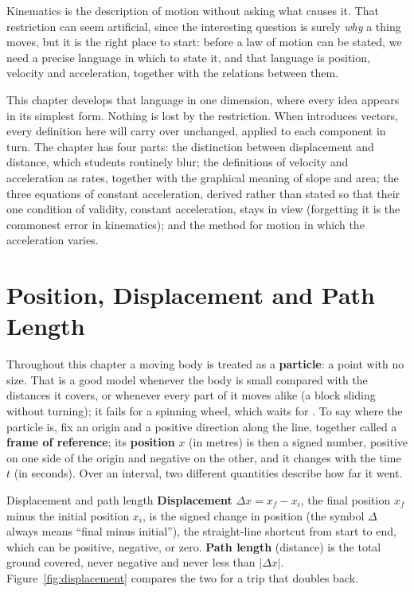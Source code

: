 
Kinematics is the description of motion without asking what causes it. That restriction can seem
artificial, since the interesting question is surely \emph{why} a thing moves, but it is the right
place to start: before a law of motion can be stated, we need a precise language in which to state it,
and that language is position, velocity and acceleration, together with the relations between them.

This chapter develops that language in one dimension, where every idea appears in its simplest form.
Nothing is lost by the restriction. When  introduces vectors, every definition here will carry
over unchanged, applied to each component in turn. The chapter has four parts: the distinction
between displacement and distance, which students routinely blur; the definitions of velocity and
acceleration as rates, together with the graphical meaning of slope and area; the three equations
of constant acceleration, derived rather than stated so that their one condition of validity,
constant acceleration, stays in view (forgetting it is the commonest error in kinematics); and the method for motion in which the acceleration varies.

\section{Position, Displacement and Path Length}

Throughout this chapter a moving body is treated as a \textbf{particle}: a point with no size. That is
a good model whenever the body is small compared with the distances it covers, or whenever every part of
it moves alike (a block sliding without turning); it fails for a spinning wheel, which waits for
. To say where the particle is, fix an origin and a positive direction along the line,
together called a \textbf{frame of reference}; its \textbf{position} $x$ (in metres) is then a signed
number, positive on one side of the origin and negative on the other, and it changes with the time $t$
(in seconds). Over an interval, two different quantities describe how far it went.

\begin{defbox}{Displacement and path length}
\textbf{Displacement} $\Delta x=x_f-x_i$, the final position $x_f$ minus the initial position $x_i$, is
the signed change in position (the symbol $\Delta$ always means ``final minus initial''), the straight-line shortcut
from start to end, which can be positive, negative, or zero. \textbf{Path length} (distance) is the
total ground covered, never negative and never less than $|\Delta x|$. Figure~\ref{fig:displacement}
compares the two for a trip that doubles back.
\end{defbox}

